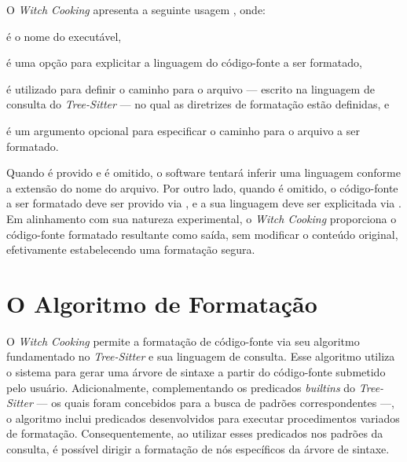 \documentclass
  [11pt,a4paper,english,brazil,openright,sumario=tradicional,twoside]
  {abntex2}
\newcommand{\treesitter}{\textit{Tree-Sitter}\xspace}
\newcommand{\witchcooking}{\textit{Witch Cooking}\xspace}
\begin{document}
  O \witchcooking apresenta a seguinte usagem
  , onde:
  \begin{inparaenum}
    \item {} é o nome do executável,
    \item \codesnippetinline{[-l LANG]} é uma opção para explicitar a linguagem
          do código-fonte a ser formatado,
    \item {} é utilizado para definir o caminho para
          o arquivo --- escrito na linguagem de consulta do \treesitter{} ---
          no qual as diretrizes de formatação estão definidas, e
    \item \codesnippetinline{[SRC]} é um argumento opcional para especificar o
          caminho para o arquivo a ser formatado.
  \end{inparaenum}
  Quando \codesnippetinline{[SRC]} é provido e \codesnippetinline{[-l LANG]} é
  omitido, o software tentará inferir uma linguagem conforme a extensão do nome
  do arquivo. Por outro lado, quando \codesnippetinline{[SRC]} é omitido, o
  código-fonte a ser formatado deve ser provido via \textit{},
  e a sua linguagem deve ser explicitada via \codesnippetinline{[-l LANG]}. Em
  alinhamento com sua natureza experimental, o \witchcooking proporciona o
  código-fonte formatado resultante como saída, sem modificar o conteúdo
  original, efetivamente estabelecendo uma formatação segura.


  \section{O Algoritmo de Formatação}
  \label{section:fmt-algorithm}

  O \witchcooking permite a formatação de código-fonte via seu algoritmo
  fundamentado no \treesitter e sua linguagem de consulta. Esse algoritmo
  utiliza o sistema para gerar uma árvore de sintaxe a partir do código-fonte
  submetido pelo usuário. Adicionalmente, complementando os predicados
  \textit{builtins} do \treesitter{} --- os quais foram concebidos para a busca
  de padrões correspondentes ---, o algoritmo inclui predicados desenvolvidos
  para executar procedimentos variados de formatação. Consequentemente, ao
  utilizar esses predicados nos padrões da consulta, é possível dirigir a
  formatação de nós específicos da árvore de sintaxe.
\end{document}
